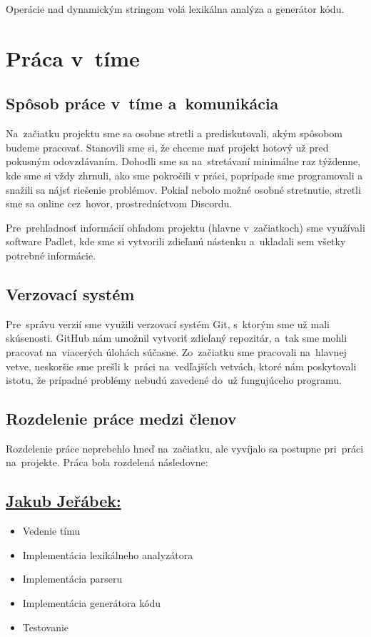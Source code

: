 \documentclass[a4paper, 11pt]{article}
\begin{document}
    Operácie nad dynamickým stringom volá lexikálna analýza a generátor kódu.


\section{Práca v~tíme}
\subsection{Spôsob práce v~tíme a~komunikácia}
Na~začiatku projektu sme sa osobne stretli a prediskutovali, akým spôsobom budeme pracovať.
Stanovili sme si, že chceme mať projekt hotový už pred pokusným odovzdávaním. Dohodli sme sa na~stretávaní minimálne raz týždenne, kde sme si vždy zhrnuli, ako sme pokročili v práci, poprípade sme
programovali a snažili sa nájsť riešenie problémov. Pokiaľ nebolo možné osobné stretnutie, stretli sme sa
online cez~hovor, prostredníctvom Discordu.

Pre~prehľadnosť informácií ohľadom projektu (hlavne v~začiatkoch) sme využívali software Padlet,
kde sme si vytvorili zdieľanú nástenku a~ukladali sem všetky potrebné informácie.

\subsection{Verzovací systém}
Pre~správu verzií sme využili verzovací systém Git, s~ktorým sme už mali skúsenosti. GitHub nám umožnil vytvoriť zdieľaný repozitár, a~tak sme mohli pracovať na~viacerých úlohách súčasne. Zo~začiatku sme pracovali na~hlavnej vetve, neskoršie sme prešli k~práci na~vedľajších vetvách, ktoré nám poskytovali istotu, že prípadné problémy nebudú zavedené do~už fungujúceho programu.

\subsection{Rozdelenie práce medzi členov}
Rozdelenie práce neprebehlo hneď na~začiatku, ale vyvíjalo sa postupne pri~práci na~projekte.
Práca bola rozdelená následovne:

\subsection*{\underline{Jakub Jeřábek:}}
\begin{itemize}
  \item Vedenie tímu
  \item Implementácia lexikálneho analyzátora
  \item Implementácia parseru
  \item Implementácia generátora kódu
  \item Testovanie
\end{itemize}
\end{document}
